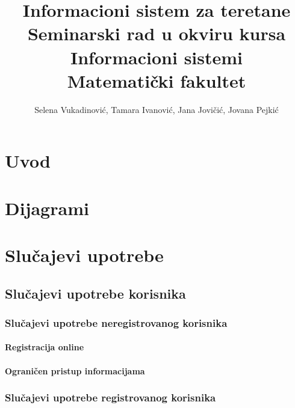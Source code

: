 \documentclass[a4paper]{article}
\begin{document}
\title{Informacioni sistem za teretane\\ \small{Seminarski rad u okviru kursa\\Informacioni sistemi\\ Matematički fakultet}}

\author{Selena Vukadinović, Tamara Ivanović, Jana Jovičić, Jovana Pejkić}


\maketitle
\newpage

\tableofcontents
\newpage

\section{Uvod}
\label{sec:uvod}


\section{Dijagrami}



\section{Slučajevi upotrebe}

\subsection{Slučajevi upotrebe korisnika}
\subsubsection{Slučajevi upotrebe neregistrovanog korisnika}
\paragraph{Registracija online}

\paragraph{Ograničen pristup informacijama}


\subsubsection{Slučajevi upotrebe registrovanog korisnika}
\end{document}
